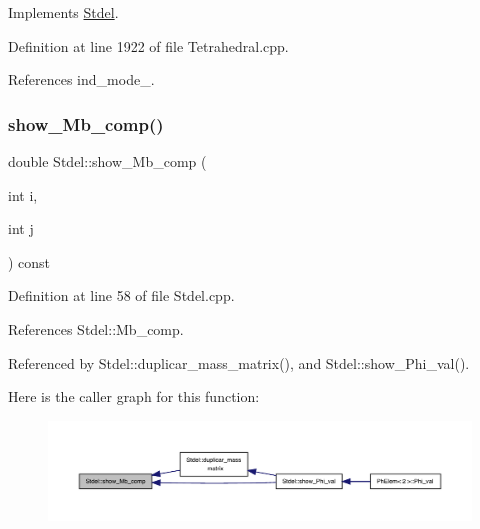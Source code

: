 Implements \hyperlink{classStdel_aa97cf7534697be1f2e02ff540ed7433b}{Stdel}.



Definition at line 1922 of file Tetrahedral.\+cpp.



References ind\+\_\+mode\+\_\+.

\mbox{\label{classStdel_a4860f0f650640f859c5f75c206ee1f60}} 
\subsubsection{\texorpdfstring{show\+\_\+\+Mb\+\_\+comp()}{show\_Mb\_comp()}}
{\footnotesize\ttfamily double Stdel\+::show\+\_\+\+Mb\+\_\+comp (\begin{DoxyParamCaption}\item[{int}]{i,  }\item[{int}]{j }\end{DoxyParamCaption}) const\hspace{0.3cm}{\ttfamily [inherited]}}



Definition at line 58 of file Stdel.\+cpp.



References Stdel\+::\+Mb\+\_\+comp.



Referenced by Stdel\+::duplicar\+\_\+mass\+\_\+matrix(), and Stdel\+::show\+\_\+\+Phi\+\_\+val().

Here is the caller graph for this function\+:
\nopagebreak
\begin{figure}[H]
\begin{center}
\leavevmode
\includegraphics[width=350pt]{classStdel_a4860f0f650640f859c5f75c206ee1f60_icgraph}
\end{center}
\end{figure}
\mbox{\label{classStdel_a44d5aa234e02fb41afd5a4e5e45fadc4}} 
